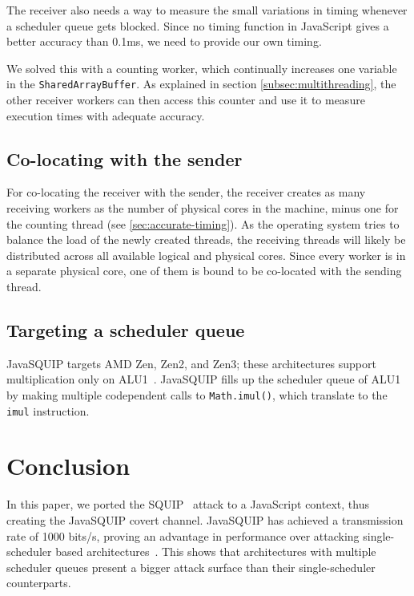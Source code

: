 \documentclass[11pt,
  titlepage=false,
]{scrreprt}
\begin{document}

The receiver also needs a way to measure the small variations in timing whenever a scheduler queue gets blocked.
Since no timing function in JavaScript gives a better accuracy than 0.1ms, we need to provide our own timing.

We solved this with a counting worker, which continually increases one variable in the \texttt{SharedArrayBuffer}.
As explained in section \ref{subsec:multithreading}, the other receiver workers can then access this counter and use it to measure execution times with adequate accuracy.

\section{Co-locating with the sender}
\label{sec:colocation}
For co-locating the receiver with the sender, the receiver creates as many receiving workers as the number of physical cores in the machine, minus one for the counting thread (see \ref{sec:accurate-timing}).
As the operating system tries to balance the load of the newly created threads, the receiving threads will likely be distributed across all available logical and physical cores.
Since every worker is in a separate physical core, one of them is bound to be co-located with the sending thread.


\section{Targeting a scheduler queue}
JavaSQUIP targets AMD Zen, Zen2, and Zen3;
these architectures support multiplication only on ALU1~\cite{AMD2020OptimizationEPYC7003}.
JavaSQUIP fills up the scheduler queue of ALU1 by making multiple codependent calls to \texttt{Math.imul()}, which translate to the \texttt{imul} instruction.



\chapter{Conclusion}
\label{ch:conclusion}
In this paper, we ported the SQUIP~\cite{squip} attack to a JavaScript context, thus creating the JavaSQUIP covert channel.
JavaSQUIP has achieved a transmission rate of 1000 bits/s, proving an advantage in performance over attacking single-scheduler based architectures~\cite{Rokicki2022webport}.
This shows that architectures with multiple scheduler queues present a bigger attack surface than their single-scheduler counterparts.
\end{document}
